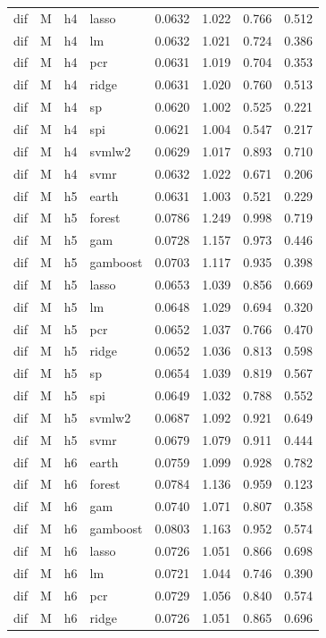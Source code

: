 \begin{ThreePartTable}
\begin{longtable}[t]{llclcccc}
dif & M & h4 & lasso & 0.0632 & 1.022 & 0.766 & 0.512\\
dif & M & h4 & lm & 0.0632 & 1.021 & 0.724 & 0.386\\
dif & M & h4 & pcr & 0.0631 & 1.019 & 0.704 & 0.353\\
dif & M & h4 & ridge & 0.0631 & 1.020 & 0.760 & 0.513\\
dif & M & h4 & sp & 0.0620 & 1.002 & 0.525 & 0.221\\
dif & M & h4 & spi & 0.0621 & 1.004 & 0.547 & 0.217\\
dif & M & h4 & svmlw2 & 0.0629 & 1.017 & 0.893 & 0.710\\
dif & M & h4 & svmr & 0.0632 & 1.022 & 0.671 & 0.206\\
\addlinespace
dif & M & h5 & earth & 0.0631 & 1.003 & 0.521 & 0.229\\
dif & M & h5 & forest & 0.0786 & 1.249 & 0.998 & 0.719\\
dif & M & h5 & gam & 0.0728 & 1.157 & 0.973 & 0.446\\
dif & M & h5 & gamboost & 0.0703 & 1.117 & 0.935 & 0.398\\
dif & M & h5 & lasso & 0.0653 & 1.039 & 0.856 & 0.669\\
dif & M & h5 & lm & 0.0648 & 1.029 & 0.694 & 0.320\\
dif & M & h5 & pcr & 0.0652 & 1.037 & 0.766 & 0.470\\
dif & M & h5 & ridge & 0.0652 & 1.036 & 0.813 & 0.598\\
dif & M & h5 & sp & 0.0654 & 1.039 & 0.819 & 0.567\\
dif & M & h5 & spi & 0.0649 & 1.032 & 0.788 & 0.552\\
dif & M & h5 & svmlw2 & 0.0687 & 1.092 & 0.921 & 0.649\\
dif & M & h5 & svmr & 0.0679 & 1.079 & 0.911 & 0.444\\
\addlinespace
dif & M & h6 & earth & 0.0759 & 1.099 & 0.928 & 0.782\\
dif & M & h6 & forest & 0.0784 & 1.136 & 0.959 & 0.123\\
dif & M & h6 & gam & 0.0740 & 1.071 & 0.807 & 0.358\\
dif & M & h6 & gamboost & 0.0803 & 1.163 & 0.952 & 0.574\\
dif & M & h6 & lasso & 0.0726 & 1.051 & 0.866 & 0.698\\
dif & M & h6 & lm & 0.0721 & 1.044 & 0.746 & 0.390\\
dif & M & h6 & pcr & 0.0729 & 1.056 & 0.840 & 0.574\\
dif & M & h6 & ridge & 0.0726 & 1.051 & 0.865 & 0.696\\

\end{longtable}
\end{ThreePartTable}

